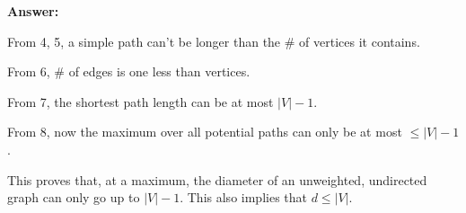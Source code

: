 \documentclass[11pt]{article}
\newenvironment{questions}
  {\begin{enumerate}}
  {\end{enumerate}}
\newenvironment{answer}
  {\vspace{0.5em}\noindent\textbf{Answer:}\par}
  {\vspace{1em}}
\newenvironment{answercols}
  {\begin{multicols}{2}}
  {\end{multicols}}
\begin{document}
\begin{questions}
\begin{answer}
\begin{answercols}
                From 4, 5, a simple path can’t be longer than the \# of vertices it contains.

                From 6, \# of edges is one less than vertices.

                From 7, the shortest path length can be at most $|V|-1$.

                From 8, now the maximum over all potential paths can only be at most $\leq |V|-1$.
            \end{answercols}

            This proves that, at a maximum, the diameter of an unweighted, undirected graph can only go up to $|V|-1$. This also implies that $d \leq |V|$.
        \end{answer}
    \end{questions}

    \pagebreak
\end{document}
